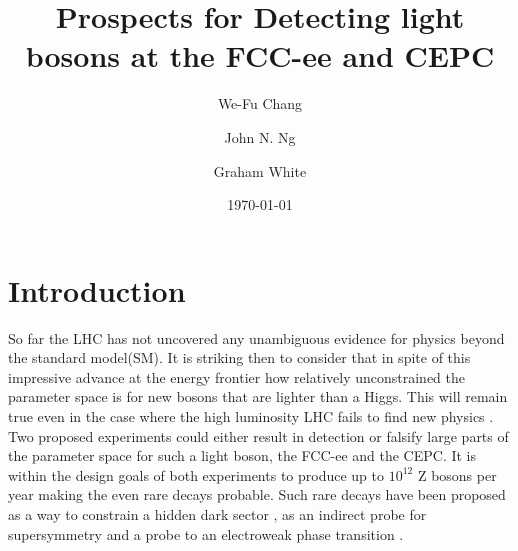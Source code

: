 \documentclass[11pt]{article}
\begin{document}
\title{Prospects for Detecting light bosons at the FCC-ee and CEPC}%
\author[a,b]{We-Fu Chang}

\author[b]{John N. Ng}

\author[b]{Graham White}%
\date{\today}


\maketitle

\section{Introduction}
So far the LHC has not uncovered any unambiguous evidence for physics beyond the standard model(SM). It is striking then to consider that in spite of this impressive advance at the energy frontier how relatively unconstrained the parameter space is for new bosons that are lighter than a Higgs.  This will remain true even in the case where the high luminosity LHC fails to find new physics \cite{Chang:2017ynj}. Two proposed experiments could either result in detection or falsify large parts of the parameter space for such a light boson, the FCC-ee and the CEPC\cite{CEPC-SPPCStudyGroup:2015csa,CEPC-SPPCStudyGroup:2015esa,Gomez-Ceballos:2013zzn,dEnterria:2016sca,dEnterria:2016fpc}. It is within the design goals of both experiments to produce up to $10^{12}$ Z bosons per year making the even rare decays probable. Such rare decays have been proposed as a way to constrain a hidden dark sector \cite{Liu:2017zdh,Wu:2017kgr}, as an indirect probe for supersymmetry \cite{Wu:2017kgr} and a probe to an electroweak phase transition \cite{Huang:2016cjm}.
\end{document}
